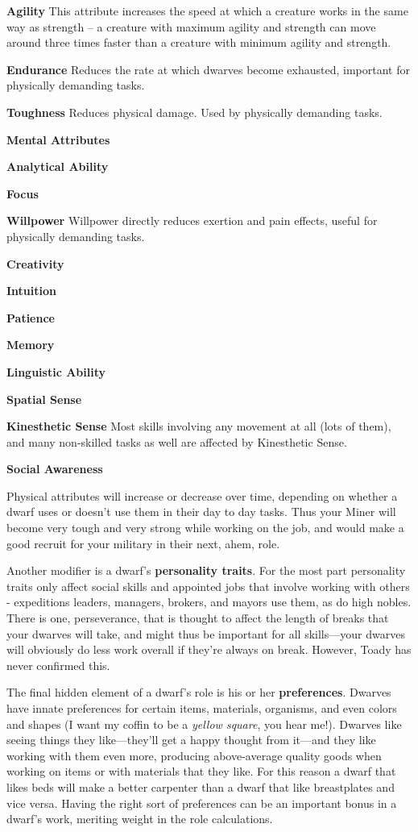 \documentclass[]{article}
\newcommand{\boldlist}[1] {
\vspace{12pt}
\noindent \textbf{#1}
}
\begin{document}
\boldlist{Agility} This attribute increases the speed at which a creature works in the same way as
strength -- a creature with maximum agility and strength can move around three times faster than a
creature with minimum agility and strength.

\boldlist{Endurance} Reduces the rate at which dwarves become exhausted, important for physically
demanding tasks.

\boldlist{Toughness} Reduces physical damage. Used by physically demanding tasks.

\boldlist{\indent Mental Attributes}

\boldlist{Analytical Ability}

\boldlist{Focus}

\boldlist{Willpower} Willpower directly reduces exertion and pain effects, useful for physically
demanding tasks.

\boldlist{Creativity}

\boldlist{Intuition}

\boldlist{Patience}

\boldlist{Memory}

\boldlist{Linguistic Ability}

\boldlist{Spatial Sense}

\boldlist{Kinesthetic Sense} Most skills involving any movement at all (lots of them), and many
non-skilled tasks as well are affected by Kinesthetic Sense.

\boldlist{Social Awareness}

\vspace{12pt}

Physical attributes will increase or decrease over time, depending on whether a dwarf uses
or doesn't use them in their day to day tasks. Thus your Miner will become very tough and very strong
while working on the job, and would make a good recruit for your military in their
next, ahem, role.

Another modifier is a dwarf's \textbf{personality traits}. For the most part
personality traits only affect social skills and appointed jobs that involve working with others -
expeditions leaders, managers, brokers, and mayors use them, as do high nobles. There is one,
perseverance, that is thought to affect the length of breaks that your dwarves will take, and might thus
be important for all skills---your dwarves will obviously do less work overall if they're
always on break. However, Toady has never confirmed this.

The final hidden element of a dwarf's role is his or her \textbf{preferences}. Dwarves
have innate preferences for certain items, materials, organisms, and even colors and shapes (I want my
coffin to be a \emph{yellow square}, you hear me!). Dwarves like seeing things they like---they'll get a
happy thought from it---and they like working with them even more, producing above-average quality goods
when working on items or with materials that they like. For this reason a dwarf that likes beds will
make a better carpenter than a dwarf that like breastplates and vice versa. Having the right sort of
preferences can be an important bonus in a dwarf's work, meriting weight in the role calculations.
\end{document}
